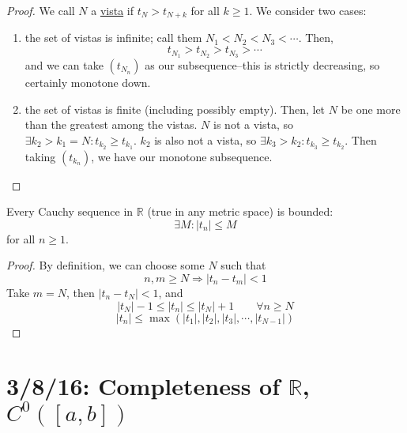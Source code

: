 \documentclass[12pt]{article}
\begin{document}
\begin{center}
\end{center}
\begin{proof}
We call $N$ a \underline{vista} if $t_N > t_{N+k}$ for all $k \ge 1$. We consider two cases:
\begin{enumerate}
\item the set of vistas is infinite; call them $N_1 < N_2 < N_3 < \cdots$. Then, \[ t_{N_1} > t_{N_2} > t_{N_3} > \cdots \] and we can take $(t_{N_n})$ as our subsequence--this is strictly decreasing, so certainly monotone down.
\item the set of vistas is finite (including possibly empty). Then, let $N$ be one more than the greatest among the vistas. $N$ is not a vista, so $\exists k_2 > k_1 = N: t_{k_2} \ge t_{k_1}$. $k_2$ is also not a vista, so $\exists k_3 > k_2: t_{k_3} \ge t_{k_2}$. Then taking $(t_{k_n})$, we have our monotone subsequence.
\end{enumerate}
\end{proof}

\begin{lemma}
Every Cauchy sequence in $\mathbb{R}$ (true in any metric space) is bounded: \[ \exists M: |t_n| \le M \] for all $n \ge 1$.
\end{lemma}

\begin{proof}
By definition, we can choose some $N$ such that \[ n,m \ge N \Rightarrow |t_n - t_m| < 1 \] Take $m = N$, then $|t_n - t_N| < 1$, and \[ |t_N| - 1 \le |t_n| \le |t_N| + 1 \qquad \forall n \ge N\]
\[ |t_n| \le \max(|t_1|,|t_2|,|t_3|,\cdots,|t_{N-1}|) \]
\end{proof}

\section{3/8/16: Completeness of $\mathbb{R}$, $C^0([a,b])$}
\end{document}
